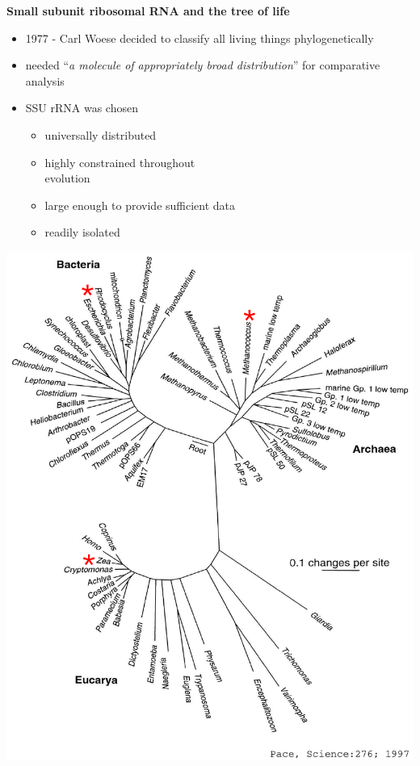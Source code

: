 \documentclass[landscape]{slides}
\begin{document}

\begin{slide}
\begin{center}
\large
\textbf{Small subunit ribosomal RNA and the tree of life}
\end{center}
\medskip
\begin{minipage}{5.2in}
\small

\begin{itemize}
\item
1977 - Carl Woese decided to classify all living things phylogenetically
\item
needed ``\emph{a molecule of appropriately broad distribution}'' for
comparative analysis
\item
SSU rRNA was chosen
\begin{itemize}
  \item
    universally distributed
  \item
    highly constrained throughout \\ evolution
  \item
    large enough to provide sufficient data%
  \item
    readily isolated
\end{itemize}
\end{itemize}

\vspace{2.5in}
\end{minipage}
\hspace{0.1in}
\begin{minipage}{5.5in}
\includegraphics[width=5.5in]{figs/bigtol}
\end{minipage}  


\end{slide}
\end{document}
